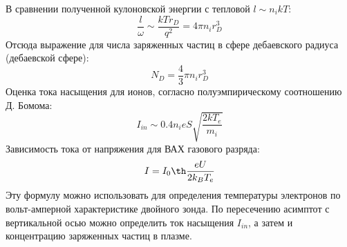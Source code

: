 \documentclass[a4paper, 12pt]{article}
\begin{document}
В сравнении полученной кулоновской энергии с тепловой $l \sim n_{i}kT$:
\begin{equation}
    \frac{l}{\omega} \sim \frac{kTr_{D}}{q^2} = 4\pi n_{i}r^3_{D}
    \label{отношение энергий}
\end{equation}
Отсюда выражение для числа заряженных частиц в сфере дебаевского радиуса (дебаевской сфере):
\begin{equation}
    N_{D} = \frac{4}{3}\pi n_{i}r^3_{D}
    \label{число заряженных частиц в дебаевской сфере}
\end{equation}
Оценка тока насыщения для ионов, согласно полуэмпирическому соотношению Д. Бомома:
\begin{equation}
    I_{in} \sim 0.4n_{i}eS\sqrt{\frac{2kT_{e}}{m_{i}}}
    \label{ток насыщения}
\end{equation}
Зависимость тока от напряжения для ВАХ газового разряда:
\begin{equation}
    I = I_{0}\th\frac{eU}{2k_{B}T_{e}}
    \label{зависимость тока от напряжения для двойного зонда}
\end{equation}
Эту формулу можно использовать для определения температуры электронов по вольт-амперной характеристике двойного зонда.
По пересечению асимптот с вертикальной осью можно определить ток насыщения $I_{in}$, а затем и концентрацию заряженных частиц в плазме.
\end{document}
